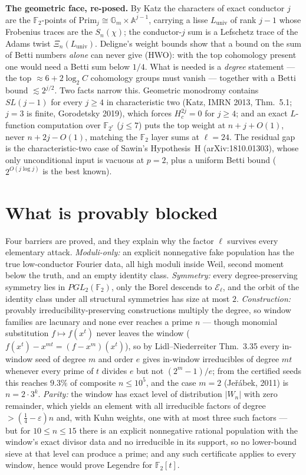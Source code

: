 \documentclass[10pt]{article}
\newcommand{\F}{\mathbb F}
\newcommand{\E}{\mathcal E}
\begin{document}
\textbf{The geometric face, re-posed.} By Katz the characters of exact
conductor $j$ are the $\F_2$-points of
$\mathrm{Prim}_j\cong\mathbb G_m\times\mathbb A^{j-1}$, carrying a lisse
$L_{\mathrm{univ}}$ of rank $j-1$ whose Frobenius traces are the $S_n(\chi)$;
the conductor-$j$ sum is a Lefschetz trace of the Adams twist
$\Xi_n(L_{\mathrm{univ}})$. Deligne's weight bounds show that a bound on the
sum of Betti numbers \emph{alone} can never give (HWO): with the top
cohomology present one would need a Betti sum below $1/4$. What is needed is a
\emph{degree} statement --- the top $\approx6+2\log_2C$ cohomology groups must
vanish --- together with a Betti bound $\lesssim2^{j/2}$. Two facts narrow
this. Geometric monodromy contains $SL(j-1)$ for every $j\geq4$ in
characteristic two (Katz, IMRN 2013, Thm.~5.1; $j=3$ is finite, Gorodetsky
2019), which forces $H^{2j}_c=0$ for $j\geq4$; and an exact $L$-function
computation over $\F_{2^r}$ ($j\leq7$) puts the top weight at $n+j+O(1)$,
never $n+2j-O(1)$, matching the $\F_2$ layer sums at $\ell=24$. The residual
gap is the characteristic-two case of Sawin's Hypothesis~H
(arXiv:1810.01303), whose only unconditional input is vacuous at $p=2$, plus
a uniform Betti bound ($2^{O(j\log j)}$ is the best known).

\section{What is provably blocked}

Four barriers are proved, and they explain why the factor $\ell$ survives every
elementary attack. \emph{Moduli-only:} an explicit nonnegative fake population
has the true low-conductor Fourier data, all high moduli inside Weil, second
moment below the truth, and an empty identity class. \emph{Symmetry:} every
degree-preserving symmetry lies in $PGL_2(\F_2)$, only the Borel descends to
$\E_\ell$, and the orbit of the identity class under all structural symmetries
has size at most $2$. \emph{Construction:} provably irreducibility-preserving
constructions multiply the degree, so window families are lacunary and none
ever reaches a prime $n$ --- though monomial substitution
$f\mapsto f(x^t)$ never leaves the window
($f(x^t)-x^{mt}=(f-x^m)(x^t)$), so by Lidl--Niederreiter Thm.~3.35 every
in-window seed of degree $m$ and order $e$ gives in-window irreducibles of
degree $mt$ whenever every prime of $t$ divides $e$ but not $(2^m-1)/e$; from
the certified seeds this reaches $9.3\%$ of composite $n\leq10^5$, and the
case $m=2$ (Je\v{r}\'abek, 2011) is $n=2\cdot3^k$. \emph{Parity:} the window
has exact level of distribution $|W_n|$ with zero remainder, which yields an
element with all irreducible factors of degree $>(\frac14-\varepsilon)n$ and,
with Kuhn weights, one with at most three such factors --- but for
$10\leq n\leq15$ there is an explicit nonnegative rational population with the
window's exact divisor data and no irreducible in its support, so no
lower-bound sieve at that level can produce a prime; and any such certificate
applies to every window, hence would prove Legendre for $\F_2[t]$.
\end{document}
